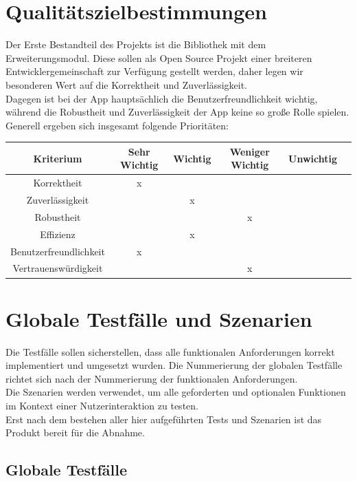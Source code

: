 \documentclass[a4paper,12pt]{article}
\begin{document}
\section{Qualitätszielbestimmungen}
Der Erste Bestandteil des Projekts ist die Bibliothek mit dem Erweiterungsmodul. Diese sollen als Open Source Projekt einer breiteren Entwicklergemeinschaft zur Verfügung gestellt werden, daher legen wir besonderen Wert auf die Korrektheit und Zuverlässigkeit.\\
Dagegen ist bei der App hauptsächlich die Benutzerfreundlichkeit wichtig, während die Robustheit und Zuverlässigkeit der App keine so große Rolle spielen. Generell ergeben sich insgesamt folgende Prioritäten:\\
\begin{tabular}[t]{|c|c|c|c|c|c|}
  \hline
  \textbf{Kriterium} & \textbf{Sehr Wichtig} & \textbf{Wichtig} & \textbf{Weniger Wichtig} & \textbf{Unwichtig}\\
  \hline
  \hline
  Korrektheit & x & & &\\ %
  \hline
  Zuverlässigkeit & & x & &\\ %
  \hline
  Robustheit & & & x &\\  %
  \hline
  Effizienz & & x & &\\ %
  \hline
  Benutzerfreundlichkeit & x & & &\\ %
  \hline
  Vertrauenswürdigkeit & & & x &\\ %
  \hline

\end{tabular}
\vspace{1cm}
\section{Globale Testfälle und Szenarien}
Die Testfälle sollen sicherstellen, dass alle funktionalen Anforderungen korrekt implementiert und umgesetzt wurden.
Die Nummerierung der globalen Testfälle richtet sich nach der Nummerierung der funktionalen Anforderungen.\\
Die Szenarien werden verwendet, um alle geforderten und optionalen Funktionen im Kontext einer Nutzerinteraktion zu testen.\\
Erst nach dem bestehen aller hier aufgeführten Tests und Szenarien ist das Produkt bereit für die Abnahme.
  \subsection{Globale Testfälle}
\end{document}
